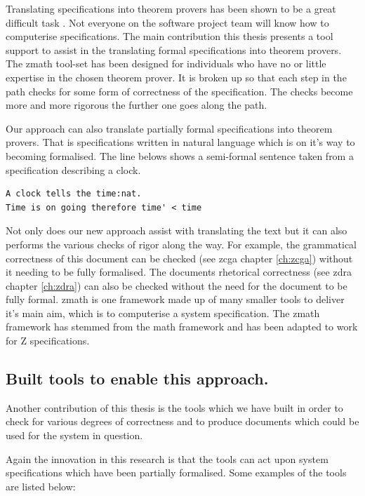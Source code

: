 Translating specifications into theorem provers has been shown to be a great
difficult task \cite{johnharrisonslides}. Not everyone on the software project
team will know how to computerise specifications. The main contribution this
thesis presents a tool support to assist in the translating formal
specifications into theorem provers. The \gls{zmath} tool-set has been designed
for individuals who have no or little expertise in the chosen theorem prover. It
is broken up so that each step in the path checks for some form of correctness
of the specification. The checks become more and more rigorous the further one
goes along the path.

Our approach can also translate partially formal specifications into theorem
provers. That is specifications written in natural language which is on it's way
to becoming formalised. The line belows shows a semi-formal sentence taken from
a specification describing a clock.

\begin{verbatim}
A clock tells the time:nat.
Time is on going therefore time' < time
\end{verbatim}

Not only does our new approach assist with translating the text but it can also
performs the various checks of rigor along the way. For example, the grammatical
correctness of this document can be checked (see \gls{zcga} chapter
\ref{ch:zcga}) without it needing to be fully formalised. The documents
rhetorical correctness (see \gls{zdra} chapter \ref{ch:zdra}) can also be
checked without the need for the document to be fully formal. \Gls{zmath} is one
framework made up of many smaller tools to deliver it's main aim, which is to
computerise a system specification. The \gls{zmath} framework has stemmed from
the \gls{math} framework \cite{mathintomizar} and has been adapted to work for Z
specifications.

\subsection{Built tools to enable this approach.}

Another contribution of this thesis is the tools which we have built in order to
check for various degrees of correctness and to produce documents which could be
used for the system in question.

Again the innovation in this research is that the tools can act upon system
specifications which have been partially formalised. Some examples of the tools
are listed below:

